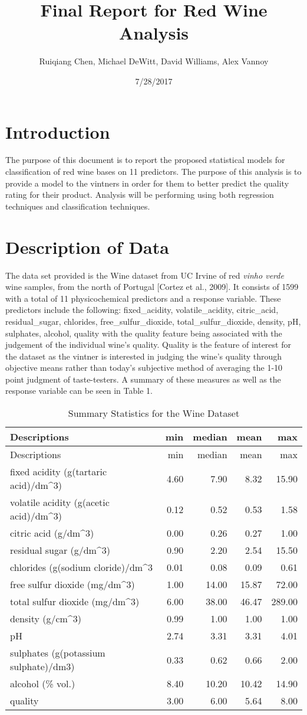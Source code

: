 \documentclass[]{article}
\title{Final Report for Red Wine Analysis}
\author{Ruiqiang Chen, Michael DeWitt, David Williams, Alex Vannoy}
\date{7/28/2017}
\begin{document}
\maketitle

\section{Introduction}\label{introduction}

The purpose of this document is to report the proposed statistical
models for classification of red wine bases on 11 predictors. The
purpose of this analysis is to provide a model to the vintners in order
for them to better predict the quality rating for their product.
Analysis will be performing using both regression techniques and
classification techniques.

\section{Description of Data}\label{description-of-data}

The data set provided is the Wine dataset from UC Irvine of red
\emph{vinho verde} wine samples, from the north of Portugal {[}Cortez et
al., 2009{]}. It consists of 1599 with a total of 11 physicochemical
predictors and a response variable. These predictors include the
following: fixed\_acidity, volatile\_acidity, citric\_acid,
residual\_sugar, chlorides, free\_sulfur\_dioxide,
total\_sulfur\_dioxide, density, pH, sulphates, alcohol, quality with
the quality feature being associated with the judgement of the
individual wine's quality. Quality is the feature of interest for the
dataset as the vintner is interested in judging the wine's quality
through objective means rather than today's subjective method of
averaging the 1-10 point judgment of taste-testers. A summary of these
measures as well as the response variable can be seen in Table 1.

\begin{longtable}[]{@{}lrrrr@{}}
\caption{Summary Statistics for the Wine Dataset}\tabularnewline
\toprule
Descriptions & min & median & mean & max\tabularnewline
\midrule
\endfirsthead
\toprule
Descriptions & min & median & mean & max\tabularnewline
\midrule
\endhead
fixed acidity (g(tartaric acid)/dm\^{}3) & 4.60 & 7.90 & 8.32 &
15.90\tabularnewline
volatile acidity (g(acetic acid)/dm\^{}3) & 0.12 & 0.52 & 0.53 &
1.58\tabularnewline
citric acid (g/dm\^{}3) & 0.00 & 0.26 & 0.27 & 1.00\tabularnewline
residual sugar (g/dm\^{}3) & 0.90 & 2.20 & 2.54 & 15.50\tabularnewline
chlorides (g(sodium cloride)/dm\^{}3 & 0.01 & 0.08 & 0.09 &
0.61\tabularnewline
free sulfur dioxide (mg/dm\^{}3) & 1.00 & 14.00 & 15.87 &
72.00\tabularnewline
total sulfur dioxide (mg/dm\^{}3) & 6.00 & 38.00 & 46.47 &
289.00\tabularnewline
density (g/cm\^{}3) & 0.99 & 1.00 & 1.00 & 1.00\tabularnewline
pH & 2.74 & 3.31 & 3.31 & 4.01\tabularnewline
sulphates (g(potassium sulphate)/dm3) & 0.33 & 0.62 & 0.66 &
2.00\tabularnewline
alcohol (\% vol.) & 8.40 & 10.20 & 10.42 & 14.90\tabularnewline
quality & 3.00 & 6.00 & 5.64 & 8.00\tabularnewline
\bottomrule
\end{longtable}
\end{document}
